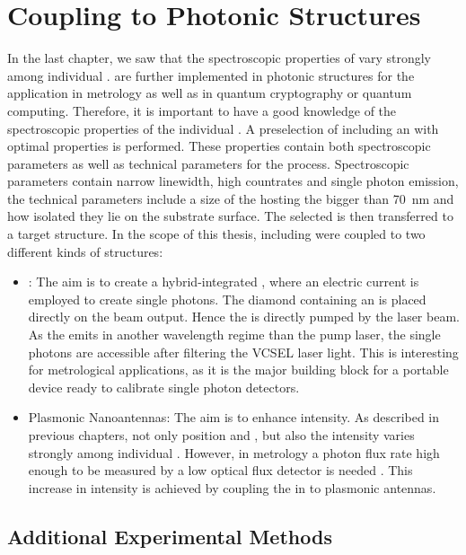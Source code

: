 
\chapter[Coupling NDs]{Coupling \Nds to Photonic Structures}	\label{ch::coupling}

	In the last chapter, we saw that the spectroscopic properties of \sivs vary strongly among individual \nds.
	\Nds are further implemented in photonic structures for the application in metrology as well as in quantum cryptography or quantum computing.
	Therefore, it is important to have a good knowledge of the spectroscopic properties of the individual  \siv.
	A preselection of \nds including an \siv with optimal properties is performed.
	These properties contain both spectroscopic parameters as well as technical parameters for the \pp process.
	Spectroscopic parameters contain narrow linewidth, high countrates and single photon emission, the technical parameters include a size of the \nds hosting the \siv bigger than \SI{70}{nm} and how isolated they lie on the substrate surface.
	The selected \nd is then transferred to a target structure.
	In the scope of this thesis, \nds including \sivs were coupled to two different kinds of structures:
	\begin{itemize}
		\item \Vcsels: The aim is to create a hybrid-integrated \sps, where an electric current is employed to create single photons. The diamond containing an \siv is placed directly on the beam output. Hence the \siv is directly pumped by the laser beam. As the \siv emits in another wavelength regime than the pump laser, the single photons are accessible after filtering the VCSEL laser light. This \sps is interesting for metrological applications, as it is the major building block for a portable device ready to calibrate single photon detectors.
		\item Plasmonic Nanoantennas: The aim is to enhance \pl intensity. As described in previous chapters, not only \ZPL position and \lw, but also the \pl intensity varies strongly among individual \sivs. However, in metrology a photon flux rate high enough to be measured by a low optical flux detector is needed \cite{Vaigu2017}. This increase in intensity is achieved by coupling the \sivs in \nds to plasmonic antennas.
	\end{itemize}


	\section{Additional Experimental Methods} \label{sec::methods_coupling}


